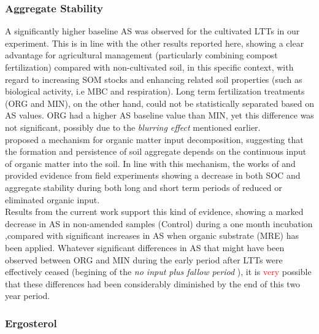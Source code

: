 \documentclass[12pt]{report}
\newcommand{\myRed}[1]{\textcolor{red}{#1}} %
\begin{document}
\subsubsection{Aggregate Stability}
A significantly higher baseline AS was observed for the cultivated LTTs in our experiment. This is in line with the other results reported here, showing a clear advantage for agricultural management (particularly combining compost fertilization) compared with non-cultivated soil, in this specific context, with regard to increasing SOM stocks and enhancing related soil properties (such as biological activity, i.e MBC and respiration). Long term fertilization treatments (ORG and MIN), on the other hand, could not be statistically separated based on AS values. ORG had a higher AS baseline value than MIN, yet this difference was not significant, possibly due to the \textit{blurring effect} mentioned earlier. \\
\citep{golchin1994} proposed a mechanism for organic matter input decomposition, suggesting that the formation and persistence of soil aggregate depends on the continuous input of organic matter into the soil. In line with this mechanism, the works of \citep{li2007} and \citep{redmile-gordon2020} provided evidence from field experiments showing a decrease in both SOC and aggregate stability during both long and short term periods of reduced or eliminated organic input.\\     
Results from the current work support this kind of evidence, showing  a marked decrease in AS in non-amended samples (Control) during a one month incubation ,compared with significant increases in AS when organic substrate (MRE) has been applied.
Whatever significant differences in AS that might have been observed between ORG and MIN during the early period after LTTs were  effectively ceased (begining of the \textit{no input plus fallow period} ), it is \myRed{very} possible that these differences had been considerably diminished by the end of this two year period.\\ 

\subsubsection{Ergosterol}
\end{document}
